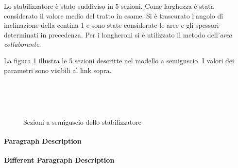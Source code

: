 \documentclass[
10pt, %
a4paper, %
oneside, %
headinclude,footinclude, %
BCOR5mm, %
]{scrartcl}
\begin{document}
Lo stabilizzatore è stato suddiviso in 5 sezioni. Come larghezza è stata considerato il valore medio del tratto in esame. Si è trascurato l'angolo di inclinazione della centina 1 e sono state considerate le aree e gli spessori determinati in precedenza. Per i longheroni si è utilizzato il metodo dell'\emph{area collaborante}.

La figura \ref{fig:semiguscio} illustra le 5 sezioni descritte nel modello a semiguscio. I valori dei parametri sono visibili al link sopra.


\begin{figure}[tb]
	\centering
	 \quad
	 \\
	 \quad
	 \\
	 \\
	\caption[descrizione a semiguscio]{Sezioni a semiguscio dello stabilizzatore} %
	\label{fig:semiguscio}
\end{figure}


























\newpage



\paragraph{Paragraph Description} \lipsum[7] %

\paragraph{Different Paragraph Description} \lipsum[8] %

\end{document}

